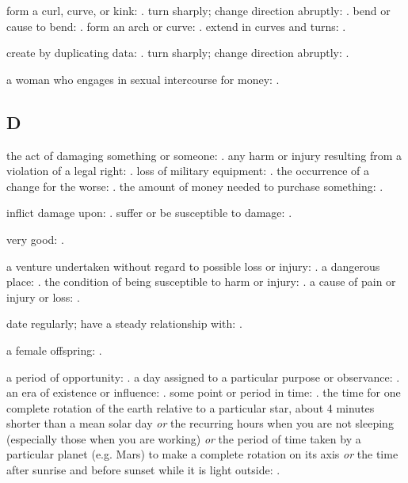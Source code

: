  form a curl, curve, or kink: . turn sharply; change direction abruptly: . bend or cause to bend: . form an arch or curve: . extend in curves and turns: .

  create by duplicating data: . turn sharply; change direction abruptly: .

  a woman who engages in sexual intercourse for money: .

\subsection*{D}

  the act of damaging something or someone: . any harm or injury resulting from a violation of a legal right: . loss of military equipment: . the occurrence of a change for the worse: . the amount of money needed to purchase something: .

  inflict damage upon: . suffer or be susceptible to damage: .

  very good: .

  a venture undertaken without regard to possible loss or injury:   . a dangerous place:   . the condition of being susceptible to harm or injury:   . a cause of pain or injury or loss:   .

  date regularly; have a steady relationship with: .

  a female offspring: .

  a period of opportunity: . a day assigned to a particular purpose or observance: . an era of existence or influence: . some point or period in time: . the time for one complete rotation of the earth relative to a particular star, about 4 minutes shorter than a mean solar day \textit{or} the recurring hours when you are not sleeping (especially those when you are working) \textit{or} the period of time taken by a particular planet (e.g. Mars) to make a complete rotation on its axis \textit{or} the time after sunrise and before sunset while it is light outside: .

